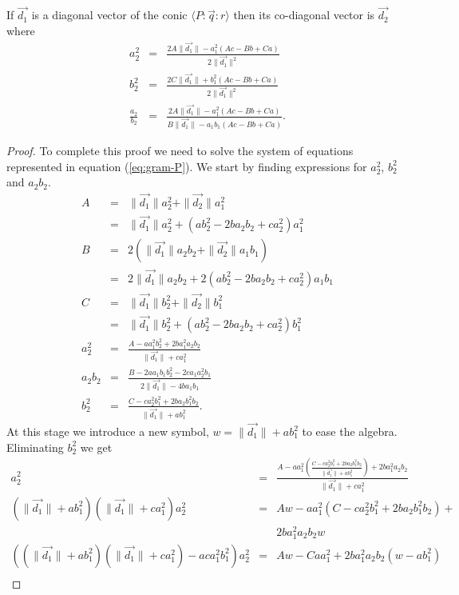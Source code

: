 \begin{theorem}\label{th:gram-covec}
If $\vec{d_1}$ is a diagonal vector of the conic $\langle P\!:\!\vec{q}\!:\!r \rangle$ then its co-diagonal vector is $\vec{d_2}$ where
\begin{eqnarray}
a_2^2 & = & \frac{2A\|\vec{d_1}\| - a_1^2(Ac - Bb + Ca)}{2\|\vec{d_1}\|^2}\\
b_2^2 & = & \frac{2C\|\vec{d_1}\| + b_1^2(Ac - Bb + Ca)}{2\|\vec{d_1}\|^2}\\
\frac{a_2}{b_2} & = & \frac{2A\|\vec{d_1}\| - a_1^2(Ac - Bb + Ca)}{B\|\vec{d_1}\| - a_1b_1(Ac - Bb + Ca)}.
\end{eqnarray}
\end{theorem}
\begin{proof}
To complete this proof we need to solve the system of equations represented in equation (\ref{eq:gram-P}). We start by finding expressions for $a_2^2$, $b_2^2$ and $a_2b_2$.
\begin{eqnarray*}
A & = & \|\vec{d_1}\|a_2^2 + \|\vec{d_2}\|a_1^2\\
  & = & \|\vec{d_1}\|a_2^2 + (ab_2^2 - 2ba_2b_2 + ca_2^2)a_1^2\\
B & = & 2(\|\vec{d_1}\|a_2b_2 + \|\vec{d_2}\|a_1b_1)\\
  & = & 2\|\vec{d_1}\|a_2b_2 + 2(ab_2^2 - 2ba_2b_2 + ca_2^2)a_1b_1\\
C & = & \|\vec{d_1}\|b_2^2 + \|\vec{d_2}\|b_1^2\\
  & = & \|\vec{d_1}\|b_2^2 + (ab_2^2 - 2ba_2b_2 + ca_2^2)b_1^2\\
a_2^2 & = & \frac{A - aa_1^2b_2^2 + 2ba_1^2a_2b_2}{\|\vec{d_1}\| + ca_1^2}\\
a_2b_2 & = & \frac{B - 2aa_1b_1b_2^2 - 2ca_1a_2^2b_1}{2\|\vec{d_1}\| - 4ba_1b_1}\\
b_2^2 & = & \frac{C - ca_2^2b_1^2 + 2ba_2b_1^2b_2}{\|\vec{d_1}\| + ab_1^2}.
\end{eqnarray*}
At this stage we introduce a new symbol, $w = \|\vec{d_1}\| + ab_1^2$ to ease the algebra. Eliminating $b_2^2$ we get
\begin{eqnarray*}
a_2^2 & = & \frac{A - aa_1^2\left(\frac{C - ca_2^2b_1^2 + 2ba_2b_1^2b_2}{\|\vec{d_1}\| + ab_1^2} \right) + 2ba_1^2a_2b_2}{\|\vec{d_1}\| + ca_1^2}\\
(\|\vec{d_1}\| + ab_1^2)(\|\vec{d_1}\| + ca_1^2)a_2^2 & = & Aw - aa_1^2(C - ca_2^2b_1^2 + 2ba_2b_1^2b_2) + \\
 &  & 2ba_1^2a_2b_2w\\
((\|\vec{d_1}\| + ab_1^2)(\|\vec{d_1}\| + ca_1^2) - aca_1^2b_1^2)a_2^2 & = & Aw - Caa_1^2 + 2ba_1^2a_2b_2(w - ab_1^2)\\

\end{eqnarray*}
\end{proof}
